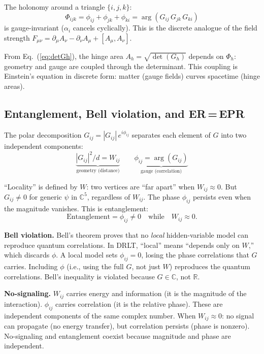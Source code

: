 \documentclass[12pt]{article}
\theoremstyle{remark}
\theoremstyle{definition}
\newcommand{\CC}{\mathbb{C}}
\begin{document}
The holonomy around a triangle $\{i, j, k\}$:
\begin{equation}
\Phi_{ijk} = \phi_{ij} + \phi_{jk} + \phi_{ki} = \arg(G_{ij}\,G_{jk}\,G_{ki})
\end{equation}
is gauge-invariant ($\alpha_i$ cancels cyclically). This is the discrete analogue of the field strength $F_{\mu\nu} = \partial_\mu A_\nu - \partial_\nu A_\mu + [A_\mu, A_\nu]$.

From Eq.~(\ref{eq:detGh}), the hinge area $A_h = \sqrt{\det(G_h)}$ depends on $\Phi_h$: geometry and gauge are coupled through the determinant. This coupling is Einstein's equation in discrete form: matter (gauge fields) curves spacetime (hinge areas).

\subsection{Entanglement, Bell violation, and ER\,=\,EPR}

The polar decomposition $G_{ij} = |G_{ij}|\,e^{i\phi_{ij}}$ separates each element of $G$ into two independent components:
\begin{equation}
\underbrace{|G_{ij}|^2/d = W_{ij}}_{\text{geometry (distance)}} \qquad \underbrace{\phi_{ij} = \arg(G_{ij})}_{\text{gauge (correlation)}}
\end{equation}

``Locality'' is defined by $W$: two vertices are ``far apart'' when $W_{ij} \approx 0$. But $G_{ij} \neq 0$ for generic $\psi$ in $\CC^5$, regardless of $W_{ij}$. The phase $\phi_{ij}$ persists even when the magnitude vanishes. This is entanglement:
\begin{equation}
\text{Entanglement} = \phi_{ij} \neq 0 \quad\text{while}\quad W_{ij} \approx 0.
\end{equation}

\textbf{Bell violation.} Bell's theorem proves that no \emph{local} hidden-variable model can reproduce quantum correlations. In DRLT, ``local'' means ``depends only on $W$,'' which discards $\phi$. A local model sets $\phi_{ij} = 0$, losing the phase correlations that $G$ carries. Including $\phi$ (i.e., using the full $G$, not just $W$) reproduces the quantum correlations. Bell's inequality is violated because $G \in \CC$, not $\mathbb{R}$.

\textbf{No-signaling.} $W_{ij}$ carries energy and information (it is the magnitude of the interaction). $\phi_{ij}$ carries correlation (it is the relative phase). These are independent components of the same complex number. When $W_{ij} \approx 0$: no signal can propagate (no energy transfer), but correlation persists (phase is nonzero). No-signaling and entanglement coexist because magnitude and phase are independent.
\end{document}
